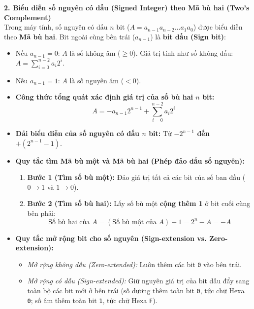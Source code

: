 \textbf{2. Biểu diễn số nguyên có dấu (Signed Integer) theo Mã bù hai (Two's Complement)}\\
Trong máy tính, số nguyên có dấu $n\text{ bit}$ ($A = a_{n-1}a_{n-2}\dots a_1a_0$) được biểu diễn theo \textbf{Mã bù hai}. Bit ngoài cùng bên trái ($a_{n-1}$) là \textbf{bit dấu (Sign bit)}:
\begin{itemize}
    \item Nếu $a_{n-1} = 0$: $A$ là số không âm ($\ge 0$). Giá trị tính như số không dấu: $A = \sum_{i=0}^{n-2} a_i 2^i$.
    \item Nếu $a_{n-1} = 1$: $A$ là số nguyên âm ($< 0$).
    \item \textbf{Công thức tổng quát xác định giá trị của số bù hai $n$ bit:}
    $$A = -a_{n-1}2^{n-1} + \sum_{i=0}^{n-2} a_i 2^i$$
    \item \textbf{Dải biểu diễn của số nguyên có dấu $n$ bit:} Từ \textbf{$-2^{n-1}$ đến $+(2^{n-1} - 1)$}.
    \item \textbf{Quy tắc tìm Mã bù một và Mã bù hai (Phép đảo dấu số nguyên):}
    \begin{enumerate}
        \item \textbf{Bước 1 (Tìm số bù một):} Đảo giá trị tất cả các bit của số ban đầu ($0 \rightarrow 1$ và $1 \rightarrow 0$).
        \item \textbf{Bước 2 (Tìm số bù hai):} Lấy số bù một \textbf{cộng thêm 1} ở bit cuối cùng bên phải:
        $$\text{Số bù hai của } A = (\text{Số bù một của } A) + 1 = 2^n - A = -A$$
    \end{enumerate}
    \item \textbf{Quy tắc mở rộng bit cho số nguyên (Sign-extension vs. Zero-extension):}
    \begin{itemize}
        \item \textit{Mở rộng không dấu (Zero-extended):} Luôn thêm các bit \texttt{0} vào bên trái.
        \item \textit{Mở rộng có dấu (Sign-extended):} Giữ nguyên giá trị của bit dấu đẩy sang toàn bộ các bit mới ở bên trái (số dương thêm toàn bit \texttt{0}, tức chữ Hexa \texttt{0}; số âm thêm toàn bit \texttt{1}, tức chữ Hexa \texttt{F}).
    \end{itemize}
\end{itemize}

